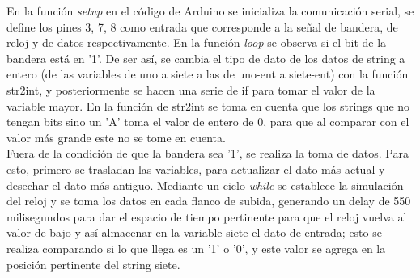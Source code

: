 \documentclass{article}
\begin{document}
En la función \textit{setup} en el código de Arduino se inicializa la comunicación serial, se define los pines 3, 7, 8 como entrada que corresponde a la señal de bandera, de reloj y de datos respectivamente. En la función \textit{loop} se observa si el bit de la bandera está en '1'. De ser así, se cambia el tipo de dato de los datos de string a entero (de las variables de uno a siete a las de uno-ent a siete-ent) con la función str2int, y posteriormente se hacen una serie de if para tomar el valor de la variable mayor. En la función de str2int se toma en cuenta que los strings que no tengan bits sino un 'A' toma el valor de entero de 0, para que al comparar con el valor más grande este no se tome en cuenta.\\

Fuera de la condición de que la bandera sea '1', se realiza la toma de datos. Para esto, primero se trasladan las variables, para actualizar el dato más actual y desechar el dato más antiguo. Mediante un ciclo \textit{while} se establece la simulación del reloj y se toma los datos en cada flanco de subida, generando un delay de 550 milisegundos para dar el espacio de tiempo pertinente para que el reloj vuelva al valor de bajo y así almacenar en la variable siete el dato de entrada; esto se realiza comparando si lo que llega es un '1' o '0', y este valor se agrega en la posición pertinente del string siete.
\end{document}
